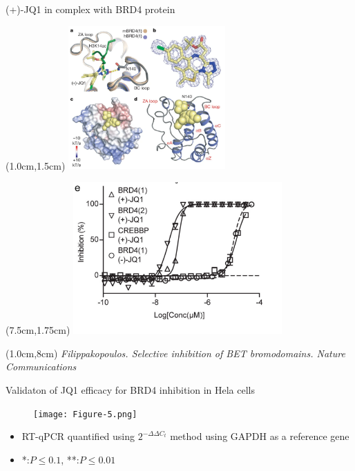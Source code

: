 \documentclass{beamer}					%
\begin{document}
\begin{frame}{(+)-JQ1 in complex with BRD4 protein}

\begin{textblock*}{6cm}(1.0cm,1.5cm)
\includegraphics[width=6cm]{JQ1_Complex.png}
\end{textblock*}

\begin{textblock*}{8cm}(7.5cm,1.75cm)
\includegraphics[width=8cm]{BRD4-Inhibition.png}
\end{textblock*}

\begin{textblock*}{\textwidth}(1.0cm,8cm)
\textit{Filippakopoulos. Selective inhibition of BET bromodomains. Nature Communications}

\end{textblock*}


\end{frame}

\begin{frame}{Validaton of JQ1 efficacy for BRD4 inhibition in Hela cells}

\begin{figure}
\texttt{[image: Figure-5.png]}
\end{figure}

\begin{itemize}
\item RT-qPCR quantified using $2^{-\Delta\Delta C_{t}}$ method using GAPDH as a reference gene
\item *:$P \leq 0.1$, **:$P \leq 0.01$
\end{itemize}

\end{frame}
\end{document}
